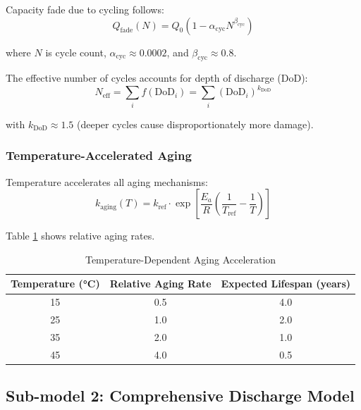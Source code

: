 Capacity fade due to cycling follows:
\begin{equation}
Q_{\text{fade}}(N) = Q_0 \left(1 - \alpha_{\text{cyc}} N^{\beta_{\text{cyc}}}\right)
\label{eq:cycle_aging}
\end{equation}

where $N$ is cycle count, $\alpha_{\text{cyc}} \approx 0.0002$, and $\beta_{\text{cyc}} \approx 0.8$.

The effective number of cycles accounts for depth of discharge (DoD):
\begin{equation}
N_{\text{eff}} = \sum_{i} f(\text{DoD}_i) = \sum_{i} (\text{DoD}_i)^{k_{\text{DoD}}}
\label{eq:effective_cycles}
\end{equation}

with $k_{\text{DoD}} \approx 1.5$ (deeper cycles cause disproportionately more damage).

\subsubsection{Temperature-Accelerated Aging}

Temperature accelerates all aging mechanisms:
\begin{equation}
k_{\text{aging}}(T) = k_{\text{ref}} \cdot \exp\left[\frac{E_a}{R}\left(\frac{1}{T_{\text{ref}}} - \frac{1}{T}\right)\right]
\label{eq:temp_aging}
\end{equation}

Table \ref{tab:aging_acceleration} shows relative aging rates.

\begin{table}[H]
\centering
\caption{Temperature-Dependent Aging Acceleration}
\label{tab:aging_acceleration}
\begin{tabular}{ccc}
\toprule
\textbf{Temperature (°C)} & \textbf{Relative Aging Rate} & \textbf{Expected Lifespan (years)} \\
\midrule
15 & 0.5 & 4.0 \\
25 & 1.0 & 2.0 \\
35 & 2.0 & 1.0 \\
45 & 4.0 & 0.5 \\
\bottomrule
\end{tabular}
\end{table}

\subsection{Sub-model 2: Comprehensive Discharge Model}

